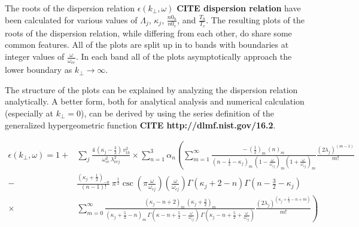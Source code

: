 \documentclass[12pt,a4paper]{article}
\begin{document}
    The roots of the dispersion relation $\epsilon(k_\perp, \omega)$ \textbf{CITE dispersion relation} have been calculated for various values of $\Lambda_j$, $\kappa_j$, $\frac{n0_h}{n0_e}$, and $\frac{T_h}{T_c}$.
    The resulting plots of the roots of the dispersion relation, while differing from each other, do share some common features.
    All of the plots are split up in to bands with boundaries at integer values of $\frac{\omega}{\omega_{ce}}$.
    In each band all of the plots asymptotically approach the lower boundary as $k_\perp \rightarrow \infty$.


    The structure of the plots can be explained by analyzing the dispersion relation analytically.
    A better form, both for analytical analysis and numerical calculation (especially at $k_\perp = 0$), can be derived by using the series definition of the generalized hypergeometric function \textbf{CITE http://dlmf.nist.gov/16.2}.

    \begin{align}
        \epsilon(k_\perp, \omega) = 1 +& \sum_j \frac{4 \, (\kappa_j - \frac{3}{2}) \, v^2_{th}}{\omega^2_{ce} \, \lambda^2_{\nu c j}} \times \sum_{n = 1}^3 \alpha_n \left( \sum_{m = 1}^\infty \frac{ -\, (\frac{1}{2})_m \, (n)_m }{(n - \frac{1}{2} - \kappa_j)_m \, (1 - \frac{\omega}{\omega_{cj}})_m (1 + \frac{\omega}{\omega_{cj}})_m } \frac{(2 \lambda_j)^{(m - 1)}}{m!} \right. \\
        -& \left. \frac{(\kappa_j + \frac{1}{2})_{-n}}{(n - 1)!} \, \pi^{\frac{1}{2}} \csc\left(\pi \frac{\omega}{\omega_{cj}}\right) \left(\frac{\omega}{\omega_{cj}}\right) \Gamma(\kappa_j + 2 - n) \Gamma(n - \frac{3}{2} - \kappa_j) \right.\\
        \times& \left. \sum_{m = 0}^\infty \frac{(\kappa_j - n + 2)_m \, (\kappa_j + \frac{3}{2})_m}{(\kappa_j + \frac{5}{2} - n)_m \, \Gamma(\kappa - n + \frac{5}{2} - \frac{\omega}{\omega_{cj}}) \, \Gamma(\kappa_j - n + \frac{5}{2} + \frac{\omega}{\omega_{cj}})} \frac{(2 \lambda_j)^{(\kappa_j + \frac{1}{2} - n + m)}}{m!} \right)
    \end{align}
\end{document}
